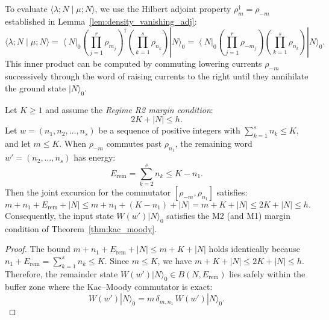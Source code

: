 To evaluate $\langle \lambda; N \mid \mu; N \rangle$, we use the Hilbert adjoint property $\rho_m^\dagger = \rho_{-m}$ established in Lemma~\ref{lem:density_vanishing_adj}:
\begin{equation}
\langle \lambda; N \mid \mu; N \rangle = \left\langle N \right|_0 \left( \prod_{j=1}^r \rho_{m_j} \right)^\dagger \left( \prod_{k=1}^s \rho_{n_k} \right) |N\rangle_0 = \left\langle N \right|_0 \left( \prod_{j=1}^r \rho_{-m_j} \right) \left( \prod_{k=1}^s \rho_{n_k} \right) |N\rangle_0.
\end{equation}
This inner product can be computed by commuting lowering currents $\rho_{-m}$ successively through the word of raising currents to the right until they annihilate the ground state $|N\rangle_0$.

\begin{lemma}
\label{lem:right_remainder_margin}
Let $K \ge 1$ and assume the \emph{Regime R2 margin condition}:
\begin{equation}
2K + |N| \le h.
\end{equation}
Let $w = (n_1, n_2, \dots, n_s)$ be a sequence of positive integers with $\sum_{k=1}^s n_k \le K$, and let $m \le K$.
When $\rho_{-m}$ commutes past $\rho_{n_1}$, the remaining word $w' = (n_2, \dots, n_s)$ has energy:
\begin{equation}
E_{\mathrm{rem}} = \sum_{k=2}^s n_k \le K - n_1.
\end{equation}
Then the joint excursion for the commutator $[\rho_{-m}, \rho_{n_1}]$ satisfies:
\begin{equation}
m + n_1 + E_{\mathrm{rem}} + |N| \le m + n_1 + (K - n_1) + |N| = m + K + |N| \le 2K + |N| \le h.
\end{equation}
Consequently, the input state $W(w') |N\rangle_0$ satisfies the M2 (and M1) margin condition of Theorem~\ref{thm:kac_moody}.
\end{lemma}

\begin{proof}
The bound $m + n_1 + E_{\mathrm{rem}} + |N| \le m + K + |N|$ holds identically because $n_1 + E_{\mathrm{rem}} = \sum_{k=1}^s n_k \le K$.
Since $m \le K$, we have $m + K + |N| \le 2K + |N| \le h$.
Therefore, the remainder state $W(w') |N\rangle_0 \in B(N, E_{\mathrm{rem}})$ lies safely within the buffer zone where the Kac--Moody commutator is exact:
\begin{equation}
[\rho_{-m}, \rho_{n_1}] W(w') |N\rangle_0 = m\, \delta_{m, n_1}\, W(w') |N\rangle_0.
\end{equation}
\end{proof}

